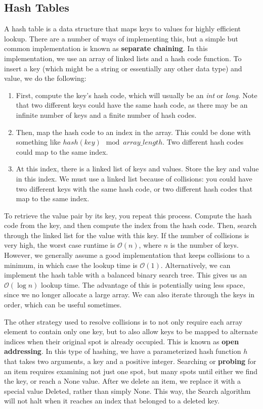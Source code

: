 \documentclass{article}
\newcommand{\bigO}{\mathcal{O}}
\begin{document}
    \subsection{Hash Tables}
    A hash table is a data structure that maps keys to values for highly efficient lookup. There are a number of ways of implementing this, but a simple but common implementation is known as \textbf{separate chaining}. In this implementation, we use an array of linked lists and a hash code function. To insert a key (which might be a string or essentially any other data type) and value, we do the following: 
    \begin{enumerate}
        \item 
        First, compute the key's hash code, which will usually be an \textit{int} or \textit{long}. Note that two different keys could have the same hash code, as there may be an infinite number of keys and a finite number of hash codes.
        \item
        Then, map the hash code to an index in the array. This could be done with something like $hash(key)\mod array\_length$. Two different hash codes could map to the same index.
        \item
        At this index, there is a linked list of keys and values. Store the key and value in this index. We must use a linked list because of collisions: you could have two different keys with the same hash code, or two different hash codes that map to the same index.
    \end{enumerate}
    To retrieve the value pair by its key, you repeat this process. Compute the hash code from the key, and then compute the index from the hash code. Then, search through the linked list for the value with this key. If the number of collisions is very high, the worst case runtime is $\bigO(n)$, where $n$ is the number of keys. However, we generally assume a good implementation that keeps collisions to a minimum, in which case the lookup time is $\bigO(1)$. Alternatively, we can implement the hash table with a balanced binary search tree. This gives us an $\bigO(\log n)$ lookup time. The advantage of this is potentially using less space, since we no longer allocate a large array. We can also iterate through the keys in order, which can be useful sometimes.

    The other strategy used to resolve collisions is to not only require each array element to contain only one key, but to also allow keys to be mapped to alternate indices when their original spot is already occupied. This is known as \textbf{open addressing}. In this type of hashing, we have a parameterized hash function $h$ that takes two arguments, a key and a positive integer. Searching or \textbf{probing} for an item requires examining not just one spot, but many spots until either we find the key, or reach a None value. After we delete an item, we replace it with a special value Deleted, rather than simply None. This way, the Search algorithm will not halt when it reaches an index that belonged to a deleted key.
    
\end{document}

